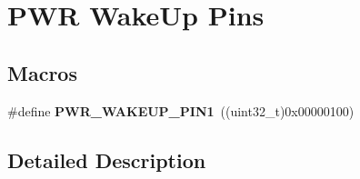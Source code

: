 \hypertarget{group___p_w_r___wake_up___pins}{}\section{P\+WR Wake\+Up Pins}
\label{group___p_w_r___wake_up___pins}
\subsection*{Macros}
\begin{DoxyCompactItemize}
\item 
\#define {\bfseries P\+W\+R\+\_\+\+W\+A\+K\+E\+U\+P\+\_\+\+P\+I\+N1}~((uint32\+\_\+t)0x00000100)\hypertarget{group___p_w_r___wake_up___pins_ga0da8e7cbe0826e93b777ae4419a1cd05}{}\label{group___p_w_r___wake_up___pins_ga0da8e7cbe0826e93b777ae4419a1cd05}

\end{DoxyCompactItemize}


\subsection{Detailed Description}
